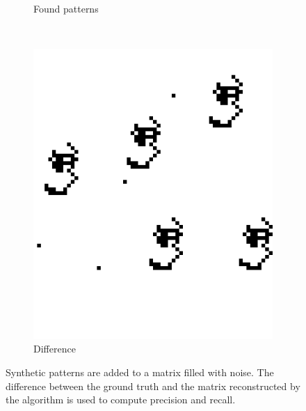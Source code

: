 \documentclass{llncs}
\begin{document}
\begin{figure}[t]
\begin{subfigure}[t]{0.25\textwidth}
\caption{Found patterns}
\label{fig:rilc}
\end{subfigure}%
~
\begin{subfigure}[t]{0.25\textwidth}
\centering
\includegraphics[scale=.9]{img/exp_diff_2_cropped.png}
\caption{Difference}
\label{fig:rild}
\end{subfigure}%
\caption{Synthetic patterns are added to a matrix filled with noise. The difference between the ground truth and the matrix reconstructed by the algorithm is used to compute precision and recall.}
\label{fig:ril}
\end{figure}  

\end{document}
